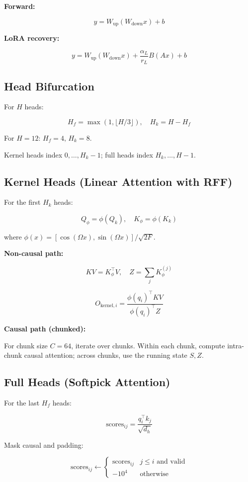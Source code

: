 \textbf{Forward:}

\[
y = W_\text{up}(W_\text{down} x) + b
\tag{4.1}
\]

\textbf{LoRA recovery:}

\[
y = W_\text{up}(W_\text{down} x) + \frac{\alpha_L}{r_L} B(A x) + b
\tag{4.2}
\]

\subsection{Head Bifurcation}

For $H$ heads:

\[
H_f = \max(1, \lfloor H / 3 \rfloor), \quad H_k = H - H_f
\tag{4.3}
\]

For $H = 12$: $H_f = 4$, $H_k = 8$.

Kernel heads index $0, \ldots, H_k - 1$; full heads index $H_k, \ldots, H - 1$.

\subsection{Kernel Heads (Linear Attention with RFF)}

For the first $H_k$ heads:

\[
Q_\phi = \phi(Q_k), \quad K_\phi = \phi(K_k)
\tag{4.4}
\]

where $\phi(x) = [\cos(\Omega x), \sin(\Omega x)] / \sqrt{2F}$.

\textbf{Non-causal path:}

\[
KV = K_\phi^\top V, \quad Z = \sum_j K_\phi^{(j)}
\tag{4.5}
\]

\[
O_{\text{kernel}, i} = \frac{\phi(q_i)^\top KV}{\phi(q_i)^\top Z}
\tag{4.6}
\]

\textbf{Causal path (chunked):}

For chunk size $C = 64$, iterate over chunks. Within each chunk, compute 
intra-chunk causal attention; across chunks, use the running state $S, Z$.

\subsection{Full Heads (Softpick Attention)}

For the last $H_f$ heads:

\[
\text{scores}_{ij} = \frac{q_i^\top k_j}{\sqrt{d_h}}
\tag{4.7}
\]

Mask causal and padding:

\[
\text{scores}_{ij} \leftarrow \begin{cases} \text{scores}_{ij} & j \leq i \text{ and valid} \\ -10^4 & \text{otherwise} \end{cases}
\tag{4.8}
\]

